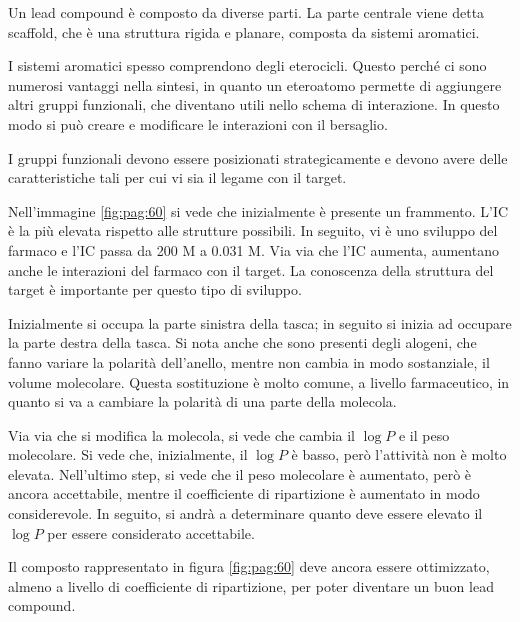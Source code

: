 Un lead compound è composto da diverse parti. La parte centrale viene
detta scaffold, che è una struttura rigida e planare, composta da
sistemi aromatici.

I sistemi aromatici spesso comprendono degli eterocicli. Questo perché
ci sono numerosi vantaggi nella sintesi, in quanto un eteroatomo
permette di aggiungere altri gruppi funzionali, che diventano utili
nello schema di interazione. In questo modo si può creare e modificare
le interazioni con il bersaglio.

I gruppi funzionali devono essere posizionati strategicamente e devono
avere delle caratteristiche tali per cui vi sia il legame con il target.


Nell'immagine{} \ref{fig:pag:60} si vede che inizialmente è presente un
frammento. L'IC è la più elevata rispetto alle strutture
possibili. In seguito, vi è uno sviluppo del farmaco e l'IC
passa da 200 \mu{}M a 0.031 \mu{}M. Via via che l'IC aumenta,
aumentano anche le interazioni del farmaco con il target. La conoscenza
della struttura del target è importante per questo tipo di sviluppo.

Inizialmente si occupa la parte sinistra della tasca; in seguito si
inizia ad occupare la parte destra della tasca. Si nota anche che sono
presenti degli alogeni, che fanno variare la polarità dell'anello,
mentre non cambia in modo sostanziale, il volume molecolare. Questa
sostituzione è molto comune, a livello farmaceutico, in quanto si va a
cambiare la polarità di una parte della molecola.

Via via che si modifica la molecola, si vede che cambia il \(\log{} P\)
e il peso molecolare. Si vede che, inizialmente, il \(\log{} P\) è
basso, però l'attività non è molto elevata. Nell'ultimo step, si vede
che il peso molecolare è aumentato, però è ancora accettabile, mentre il
coefficiente di ripartizione è aumentato in modo considerevole. In
seguito, si andrà a determinare quanto deve essere elevato il
\(\log{} P\) per essere considerato accettabile.

Il composto rappresentato in figura \ref{fig:pag:60} deve ancora essere
ottimizzato, almeno a livello di coefficiente di ripartizione, per poter
diventare un buon lead compound.

